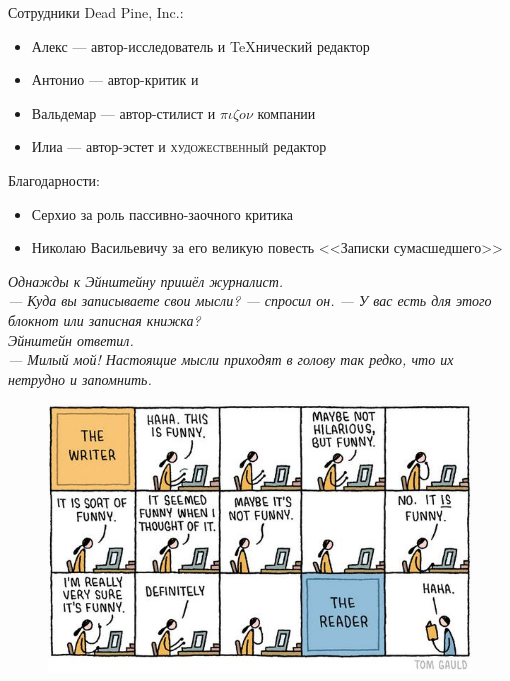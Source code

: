 \documentclass{ideas}
\renewcommand{\author}{Dead Pine, Inc.}
\begin{document}
\vfill
\begin{center}
Сотрудники \author:
  \begin{itemize}
    \item Алекс ---  автор-исследователь и {\TeX}нический редактор
    \item Антонио --- автор-критик и 
    \item Вальдемар --- автор-стилист и \( \pi\iota\zeta o \nu \) компании
    \item Илиа --- автор-эстет и {\selectfont\scshape художественный} редактор
  \end{itemize}

\vfill
Благодарности:
  \begin{itemize}
    \item Серхио за роль пассивно-заочного критика
    \item Николаю Васильевичу за его великую повесть <<Записки сумасшедшего>>
  \end{itemize}
\end{center}
\vfill
\newpage
\emph{Однажды к Эйнштейну пришёл журналист.\\
--- Куда вы записываете свои мысли? --- спросил он. --- У вас есть для этого блокнот или записная книжка?\\
Эйнштейн ответил.\\
--- Милый мой! Настоящие мысли приходят в голову так редко, что их нетрудно и запомнить.}
\begin{figure}[ht!]
    \centering
    \includegraphics[width=\textwidth]{ideas}
\end{figure}
\newpage
\end{document}
